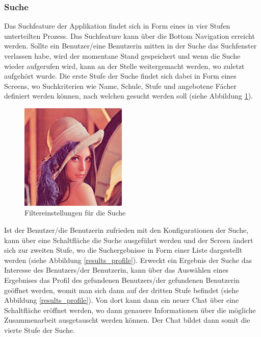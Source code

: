 \documentclass[../main.tex]{subfiles}
\begin{document}
\subsubsection*{Suche}
Das Suchfeature der Applikation findet sich in Form eines in vier Stufen unterteilten Prozess. Das Suchfeature kann über die Bottom Navigation erreicht werden. Sollte ein Benutzer/eine Benutzerin mitten in der Suche das Suchfenster verlassen habe, wird der momentane Stand gespeichert und wenn die Suche wieder aufgerufen wird, kann an der Stelle weitergemacht werden, wo zuletzt aufgehört wurde. Die erste Stufe der Suche findet sich dabei in Form eines Screens, wo Suchkriterien wie Name, Schule, Stufe und angebotene Fächer definiert werden können, nach welchen gesucht werden soll (siehe Abbildung \ref{searchOverview}).
\begin{figure} 
	\centering
	\includegraphics[width=0.45\textwidth, height=0.45\textwidth/9*16]{./images/lena.jpg}
	\caption{Filtereinstellungen für die Suche}
	\label{searchOverview}
\end{figure} 
Ist der Benutzer/die Benutzerin zufrieden mit den Konfigurationen der Suche, kann über eine Schaltfläche die Suche ausgeführt werden und der Screen ändert sich zur zweiten Stufe, wo die Suchergebnisse in Form einer Liste dargestellt werden (siehe Abbildung \ref{results_profile}). Erweckt ein Ergebnis der Suche das Interesse des Benutzers/der Benutzerin, kann über das Auswählen eines Ergebnises das Profil des gefundenen Benutzers/der gefundenen Benutzerin geöffnet werden, womit man sich dann auf der dritten Stufe befindet (siehe Abbildung  \ref{results_profile}). Von dort kann dann ein neuer Chat über eine Schaltfläche eröffnet werden, wo dann genauere Informationen über die mögliche Zusammenarbeit ausgetauscht werden können. Der Chat bildet dann somit die vierte Stufe der Suche.
\end{document}
